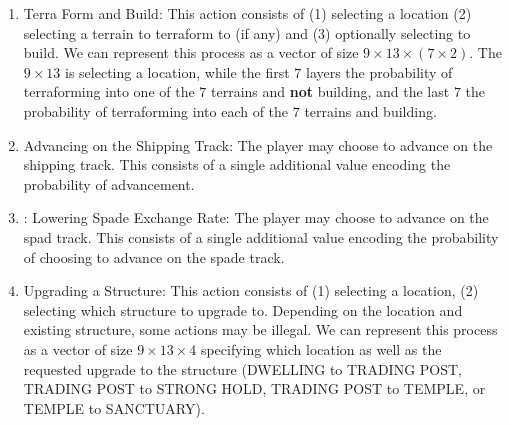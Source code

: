 \documentclass[8pt,twocolumn]{article}
\begin{document}
\begin{enumerate}
    \item Terra Form and Build: This action consists of (1) selecting a location (2) selecting a terrain to terraform to (if any) and (3) optionally selecting to build.  We can represent this process as a vector of size $9 \times 13 \times (7\times 2)$. The $9 \times 13$ is selecting a location, while the first $7$ layers the probability of terraforming into one of the $7$ terrains and \textbf{not} building, and the last $7$ the probability of terraforming into each of the $7$ terrains and building.
    \item Advancing on the Shipping Track: The player may choose to advance on the shipping track. This consists of a single additional value encoding the probability of advancement.
    \item: Lowering Spade Exchange Rate: The player may choose to advance on the spad track. This consists of a single additional value encoding the probability of choosing to advance on the spade track.
    \item Upgrading a Structure: This action consists of (1) selecting a location, (2) selecting which structure to upgrade to. Depending on the location and existing structure, some actions may be illegal. We can represent this process as a vector of size $9 \times 13 \times 4$ specifying which location as well as the requested upgrade to the structure (DWELLING to TRADING POST, TRADING POST to STRONG HOLD, TRADING POST to TEMPLE, or TEMPLE to SANCTUARY).
    

\end{enumerate}
\end{document}
